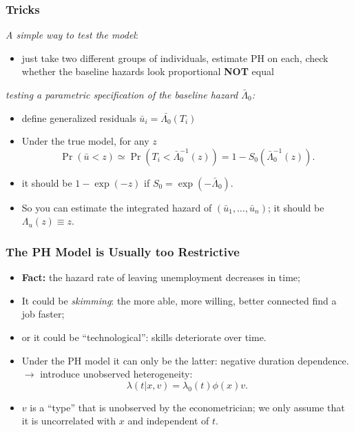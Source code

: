 \documentclass[aspectratio=169]{beamer}
\begin{document}
\begin{frame}
\frametitle{Tricks}

{\em A simple way to test the model}:
\begin{itemize}
\item just take two different groups of individuals, estimate PH on each, check whether the baseline
hazards look \alert{proportional} \textbf{NOT} \alert{equal}
\end{itemize}

 {\em testing a  parametric specification of the baseline
hazard $\bar{\Lambda}_0$:} 
\begin{itemize}
\item define  generalized residuals $\bar{u}_i=\bar{\Lambda_0}(T_i)$
\item Under the true  model, for any $z$
\[
\Pr(\bar{u} <z) \simeq
\Pr(T_i<\bar{\Lambda}_0^{-1}(z))=1-S_0(\bar{\Lambda}_0^{-1}(z)).
 \]
\item it should be $1-\exp(-z)$ if $S_0=\exp(-\bar{\Lambda}_0)$.
\item So you can estimate the integrated hazard of
 $(\bar{u}_1,\ldots,\bar{u}_n)$; it should be $\Lambda_u(z) \equiv z$.
\end{itemize}
\end{frame}


\begin{frame}
\frametitle{The PH Model is Usually too Restrictive}
\begin{itemize}
\item {\bf Fact:}  the hazard rate of leaving unemployment decreases
in time;
\item It could be {\em skimming}: the more able, more willing, better
connected find a job faster;
\item or it could be ``technological'': skills deteriorate over time.
\item Under the PH model it can only be the latter: negative duration
dependence. $\rightarrow$ introduce unobserved heterogeneity:
\[
\lambda(t \vert x,v)=\lambda_0(t)\phi(x) v.
\]
\item $v$ is a ``type'' that is unobserved by the econometrician; we
only assume that it is uncorrelated with $x$ and independent of $t$.
\end{itemize}
\end{frame}
\end{document}
